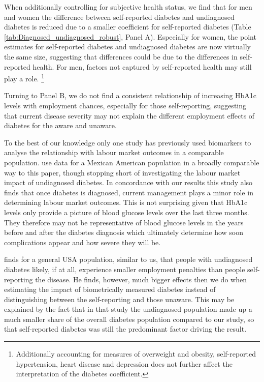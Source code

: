 When additionally controlling for subjective health status, we find that for men and women the difference between self-reported diabetes and undiagnosed diabetes is reduced due to a smaller coefficient for self-reported diabetes (Table \ref{tab:Diagnosed_undiagnosed_robust}, Panel A). Especially for women, the point estimates for self-reported diabetes and undiagnosed diabetes are now virtually the same size, suggesting that differences could be due to the differences in self-reported health. For men, factors not captured by self-reported health may still play a role. \footnote{Additionally accounting for measures of overweight and obesity, self-reported hypertension, heart disease and depression does not further affect the interpretation of the diabetes coefficient.}

Turning to Panel B, we do not find a consistent relationship of increasing \ac{HbA1c} levels with employment chances, especially for those self-reporting, suggesting that current disease severity may not explain the different employment effects of diabetes for the aware and unaware.

To the best of our knowledge only one study has previously used biomarkers to analyse the relationship with labour market outcomes in a comparable population. \textcite{BrownIII2011} use data for a Mexican American population in a broadly comparable way to this paper, though stopping short of investigating the labour market impact of undiagnosed diabetes. In concordance with our results this study also finds that once diabetes is diagnosed, current management plays a minor role in determining labour market outcomes. This is not surprising given that \ac{HbA1c} levels only provide a picture of blood glucose levels over the last three months. They therefore may not be representative of blood glucose levels in the years before and after the diabetes diagnosis which ultimately determine how soon complications appear and how severe they will be.

\parencite{Minor2015} finds for a general USA population, similar to us, that people with undiagnosed diabetes likely, if at all, experience smaller employment penalties than people self-reporting the disease. He finds, however, much bigger effects then we do when estimating the impact of biometrically measured diabetes instead of distinguishing between the self-reporting and those unaware. This may be explained by the fact that in that study the undiagnosed population made up a much smaller share of the overall diabetes population compared to our study, so that self-reported diabetes was still the predominant factor driving the result.  



